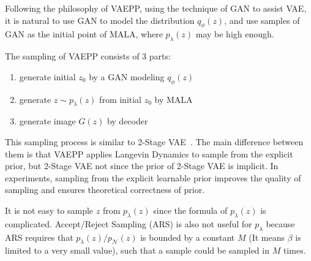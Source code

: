 Following the philosophy of VAEPP, \IE using the technique of GAN to assist VAE, it is natural to use GAN to model the distribution $q_\phi(z)$, and use samples of GAN as the initial point of MALA, where $p_\lambda(z)$ may be high enough. 

The sampling of VAEPP consists of 3 parts: 
\begin{enumerate}
	\item generate initial $z_0$ by a GAN modeling $q_\phi(z)$
	\item generate $z \sim p_\lambda(z)$ from initial $z_0$ by MALA
	\item generate image $G(z)$ by decoder
\end{enumerate}

This sampling process is similar to 2-Stage VAE~\cite{dai2019diagnosing}. The main difference between them is that VAEPP applies Langevin Dynamics to sample from the explicit prior, but 2-Stage VAE not since the prior of 2-Stage VAE is implicit. In experiments, sampling from the explicit learnable prior improves the quality of sampling and ensures theoretical correctness of prior. 

It is not easy to sample $z$ from $p_\lambda(z)$ since the formula of $p_\lambda(z)$ is complicated. Accept/Reject Sampling (ARS) is also not useful for $p_\lambda$ because ARS requires that $p_\lambda(z) / p_\mathcal{N}(z)$ is bounded by a constant $M$ (It means $\beta$ is limited to a very small value), such that a sample could be sampled in $M$ times.


 
 